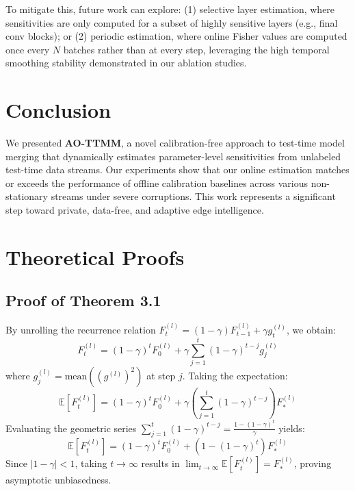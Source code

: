 \documentclass{article}
\theoremstyle{plain}
\theoremstyle{definition}
\begin{document}
To mitigate this, future work can explore: (1) selective layer estimation, where sensitivities are only computed for a subset of highly sensitive layers (e.g., final conv blocks); or (2) periodic estimation, where online Fisher values are computed once every $N$ batches rather than at every step, leveraging the high temporal smoothing stability demonstrated in our ablation studies.

\section{Conclusion}
\label{submission-conclusion}

We presented \textbf{AO-TTMM}, a novel calibration-free approach to test-time model merging that dynamically estimates parameter-level sensitivities from unlabeled test-time data streams. Our experiments show that our online estimation matches or exceeds the performance of offline calibration baselines across various non-stationary streams under severe corruptions. This work represents a significant step toward private, data-free, and adaptive edge intelligence.

\nocite{*}



\clearpage
\appendix
\section{Theoretical Proofs}
\label{appendix-proofs}

\subsection{Proof of Theorem 3.1}
\label{appendix-proof-thm1}
By unrolling the recurrence relation $F_t^{(l)} = (1 - \gamma) F_{t-1}^{(l)} + \gamma g_t^{(l)}$, we obtain:
\begin{equation}
    F_t^{(l)} = (1 - \gamma)^t F_0^{(l)} + \gamma \sum_{j=1}^t (1 - \gamma)^{t-j} g_j^{(l)}
\end{equation}
where $g_j^{(l)} = \text{mean}((g^{(l)})^2)$ at step $j$. Taking the expectation:
\begin{equation}
    \mathbb{E}[F_t^{(l)}] = (1 - \gamma)^t F_0^{(l)} + \gamma \left( \sum_{j=1}^t (1 - \gamma)^{t-j} \right) F_*^{(l)}
\end{equation}
Evaluating the geometric series $\sum_{j=1}^t (1 - \gamma)^{t-j} = \frac{1 - (1 - \gamma)^t}{\gamma}$ yields:
\begin{equation}
    \mathbb{E}[F_t^{(l)}] = (1 - \gamma)^t F_0^{(l)} + (1 - (1 - \gamma)^t) F_*^{(l)}
\end{equation}
Since $|1 - \gamma| < 1$, taking $t \to \infty$ results in $\lim_{t \to \infty} \mathbb{E}[F_t^{(l)}] = F_*^{(l)}$, proving asymptotic unbiasedness.
\end{document}
